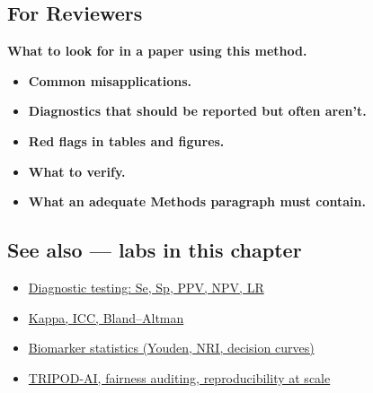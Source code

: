\documentclass[
]{article}
\providecommand{\tightlist}{%
  \setlength{\itemsep}{0pt}\setlength{\parskip}{0pt}}
\begin{document}
\subsection{For Reviewers}\label{for-reviewers}

\textbf{What to look for in a paper using this method.}

\begin{itemize}
\tightlist
\item
  \textbf{Common misapplications.}
\item
  \textbf{Diagnostics that should be reported but often aren't.}
\item
  \textbf{Red flags in tables and figures.}
\item
  \textbf{What to verify.}
\item
  \textbf{What an adequate Methods paragraph must contain.}
\end{itemize}

\subsection{See also --- labs in this
chapter}\label{see-also-labs-in-this-chapter}

\begin{itemize}
\tightlist
\item
  \href{labs/lab-diagnostic-testing-se-sp-ppv-npv-lr.Rmd}{Diagnostic
  testing: Se, Sp, PPV, NPV, LR}
\item
  \href{labs/lab-kappa-icc-bland-altman.Rmd}{Kappa, ICC, Bland--Altman}
\item
  \href{labs/lab-biomarker-statistics-youden-nri-decision-curves.Rmd}{Biomarker
  statistics (Youden, NRI, decision curves)}
\item
  \href{labs/lab-tripod-ai-fairness-auditing-reproducibility-at-scale.Rmd}{TRIPOD-AI,
  fairness auditing, reproducibility at scale}
\end{itemize}
\end{document}
